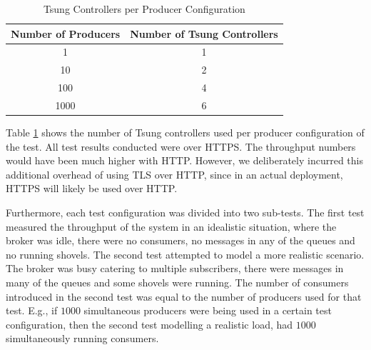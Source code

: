 \documentclass[conference, 10pt]{IEEEtran}
\begin{document}
\begin{table}[H]
\centering
\begin{tabular}{||c c||} 
 \hline
 Number of Producers & Number of Tsung Controllers \\ [0.5ex] 
 \hline\hline
 1 & 1 \\
 \hline 
 10 & 2 \\
 \hline
 100 & 4 \\
 \hline
 1000 & 6 \\
 \hline
\end{tabular}
\vspace{1em}
\caption{Tsung Controllers per Producer Configuration}
\label{controllers}
\end{table}

Table \ref{controllers} shows the number of Tsung controllers used per producer configuration of the test. All test results conducted were over HTTPS. The throughput numbers would have been much higher with HTTP. However, we deliberately incurred this additional overhead of using TLS over HTTP, since in an actual deployment, HTTPS will likely be used over HTTP.

Furthermore, each test configuration was divided into two sub-tests. The first test measured the throughput of the system in an idealistic situation, where the broker was idle, there were no consumers, no messages in any of the queues and no running shovels. The second test attempted to model a more realistic scenario. The broker was busy catering to multiple subscribers, there were messages in many of the queues and some shovels were running. The number of consumers introduced in the second test was equal to the number of producers used for that test. E.g., if $1000$ simultaneous producers were being used in a certain test configuration, then the second test modelling a realistic load, had $1000$ simultaneously running consumers.
\end{document}
